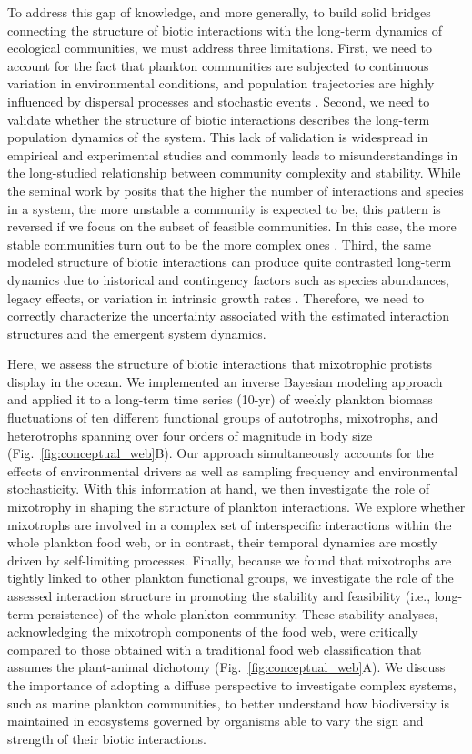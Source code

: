 \documentclass[12pt]{article}
\begin{document}
To address this gap of knowledge, and more generally, to build solid bridges connecting the structure of biotic interactions with the long-term dynamics of ecological communities, we must address three limitations. First, we need to account for the fact that plankton communities are subjected to continuous variation in environmental conditions, and population trajectories are highly influenced by dispersal processes and stochastic events \citep{Thompson2020,Shoemaker2019}. Second, we need to validate whether the structure of biotic interactions describes the long-term population dynamics of the system. This lack of validation is widespread in empirical and experimental studies and commonly leads to misunderstandings in the long-studied relationship between community complexity and stability. While the seminal work by \citet{May1972} posits that the higher the number of interactions and species in a system, the more unstable a community is expected to be, this pattern is reversed if we focus on the subset of feasible communities. In this case, the more stable communities turn out to be the more complex ones \citep{Roberts1974}. Third, the same modeled structure of biotic interactions can produce quite contrasted long-term dynamics due to historical and contingency factors such as species abundances, legacy effects, or variation in intrinsic growth rates \citep{Song2020a}. Therefore, we need to correctly characterize the uncertainty associated with the estimated interaction structures and the emergent system dynamics.

Here, we assess the structure of biotic interactions that mixotrophic protists display in the ocean. We implemented an inverse Bayesian modeling approach and applied it to a long-term time series (10-yr) of weekly plankton biomass fluctuations of ten different functional groups of autotrophs, mixotrophs, and heterotrophs spanning over four orders of magnitude in body size (Fig.~\ref{fig:conceptual_web}B). Our approach simultaneously accounts for the effects of environmental drivers as well as sampling frequency and environmental stochasticity. With this information at hand, we then investigate the role of mixotrophy in shaping the structure of plankton interactions. We explore whether mixotrophs are involved in a complex set of interspecific interactions within the whole plankton food web, or in contrast, their temporal dynamics are mostly driven by self-limiting processes. Finally, because we found that mixotrophs are tightly linked to other plankton functional groups, we investigate the role of the assessed interaction structure in promoting the stability and feasibility (i.e., long-term persistence) of the whole plankton community. These stability analyses, acknowledging the mixotroph components of the food web, were critically compared to those obtained with a traditional food web classification that assumes the plant-animal dichotomy (Fig.~\ref{fig:conceptual_web}A). We discuss the importance of adopting a diffuse perspective to investigate complex systems, such as marine plankton communities, to better understand how biodiversity is maintained in ecosystems governed by organisms able to vary the sign and strength of their biotic interactions.
\end{document}
